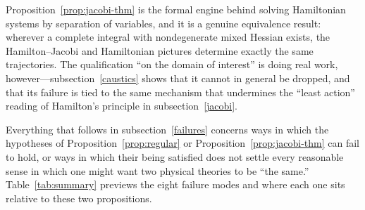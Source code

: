 Proposition~\ref{prop:jacobi-thm} is the formal engine behind solving
Hamiltonian systems by separation of variables, and it is a genuine equivalence
result: wherever a complete integral with nondegenerate mixed Hessian exists,
the Hamilton--Jacobi and Hamiltonian pictures determine exactly the same
trajectories. The qualification ``on the domain of interest'' is doing real
work, however---subsection~\ref{caustics} shows that it cannot in general be
dropped, and that its failure is tied to the same mechanism that undermines the
``least action'' reading of Hamilton's principle in subsection~\ref{jacobi}.

Everything that follows in subsection~\ref{failures} concerns ways in which the
hypotheses of Proposition~\ref{prop:regular} or
Proposition~\ref{prop:jacobi-thm} can fail to hold, or ways in which their
being satisfied does not settle every reasonable sense in which one might want
two physical theories to be ``the same.'' Table~\ref{tab:summary} previews the
eight failure modes and where each one sits relative to these two propositions.

